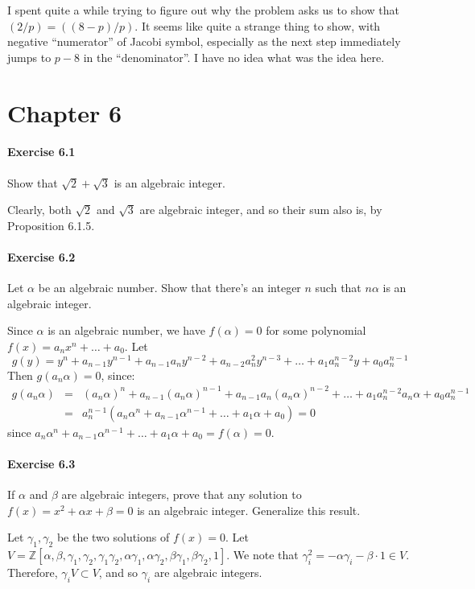 \documentclass[notitlepage]{article}
\theoremstyle{definition}
\newcommand\Z{\mathbb{Z}}
\begin{document}
I spent quite a while trying to figure out why the problem asks us to
show that $(2/p) = ((8-p)/p)$. It seems like quite a strange thing to
show, with negative ``numerator'' of Jacobi symbol, especially as the
next step immediately jumps to $p-8$ in the ``denominator''. I have no
idea what was the idea here.

\section{Chapter 6}
\paragraph{Exercise 6.1}
Show that $\sqrt{2} + \sqrt{3}$ is an algebraic integer.

Clearly, both $\sqrt{2}$ and $\sqrt{3}$ are algebraic integer, and so
their sum also is, by Proposition 6.1.5.

\paragraph{Exercise 6.2}
Let $\alpha$ be an algebraic number. Show that there's an integer $n$
such that $n\alpha$ is an algebraic integer.

Since $\alpha$ is an algebraic number, we have $f(\alpha) = 0$ for
some polynomial $f(x) = a_n x^n + \ldots + a_0$. Let
\begin{equation}
g(y) = y^n + a_{n-1} y^{n-1} + a_{n-1} a_n y^{n-2} + a_{n-2} a_n^2 y^{n-3} + \ldots + a_1 a_n^{n-2} y + a_0 a_n^{n-1}
\end{equation}
Then $g(a_n \alpha) = 0$, since:
\begin{eqnarray}
  g(a_n \alpha) &=& (a_n \alpha)^n + a_{n-1} (a_n \alpha)^{n-1} +
  a_{n-1} a_n (a_n \alpha)^{n-2} + \ldots + a_1 a_n^{n-2} a_n \alpha +
  a_0 a_n^{n-1} \\ &=& a_n^{n-1}(a_n \alpha^n + a_{n-1} \alpha^{n-1} +
  \ldots + a_1 \alpha + a_0) = 0
\end{eqnarray}
since $a_n \alpha^n + a_{n-1} \alpha^{n-1} + \ldots + a_1 \alpha + a_0
= f(\alpha) = 0$.

\paragraph{Exercise 6.3}
If $\alpha$ and $\beta$ are algebraic integers, prove that any
solution to $f(x) = x^2 + \alpha x + \beta = 0$ is an algebraic
integer. Generalize this result.

Let $\gamma_1, \gamma_2$ be the two solutions of $f(x) = 0$. Let $V =
\Z[\alpha, \beta, \gamma_1, \gamma_2, \gamma_1 \gamma_2,
  \alpha \gamma_1, \alpha \gamma_2, \beta \gamma_1, \beta \gamma_2,
  1]$. We note that $\gamma_i^2 = - \alpha \gamma_i - \beta \cdot 1
\in V$. Therefore, $\gamma_i V \subset V$, and so $\gamma_i$ are
algebraic integers.
\end{document}
